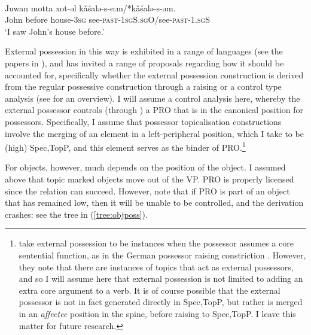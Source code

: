 \documentclass[output=paper
,modfonts
,nonflat]{langsci/langscibook}
\begin{document}
\begin{exe}
	\ex \citet[][346]{nikolaeva1999} \label{ex:n1999possess2}\\
	\gll Juwan motta xot-əl k\v{a}\'{s}alə-s-e:m/*k\v{a}\'{s}alə-s-əm.\\
		 John before house-\textsc{3sg} see-\textsc{past-1sgS.sgO}/see-\textsc{past-1.sgS}\\
	\glt `I saw John's house before.'\label{ex:n1999272}
\end{exe}
\noindent External possession in this way is exhibited in a range of languages (see the papers in \citealp{paynebarshi1999}), and has invited a range of proposals regarding how it should be accounted for, specifically whether the external possession construction is derived from the regular possessive construction through a raising or a control type analysis (see \citealt{deal2013b} for an overview). 
I will assume a control analysis here, whereby the external possessor controls (through \agree) a PRO that is in the canonical position for possessors.
Specifically, I assume that possessor topicalisation constructions involve the merging of an element in a left-peripheral position, which I take to be (high) Spec,TopP, and this element serves as the binder of PRO.\footnote{\citet{paynebarshi1999b} take external possession to be instances when the possessor assumes a core sentential function, as in the German possessor raising constriction \citep{hole2005}. However, they note that there are instances of topics that act as external possessors, and so I will assume here that external possession is not limited to adding an extra core argument to a verb.
It is of course possible that the external possessor is not in fact generated directly in Spec,TopP, but rather is merged in an \textit{affectee} position in the spine, before raising to Spec,TopP. 
I leave this matter for future research.} 


For objects, however, much depends on the position of the object. I assumed above that topic marked objects move out of the VP. PRO is properly licensed since the \agree{} relation can succeed.
However, note that if PRO is part of an object that has remained low, then it will be unable to be controlled, and the derivation crashes: see the tree in (\ref{tree:objposs}).

\begin{exe}
\ex \label{tree:objposs}
\end{exe}
\end{document}
